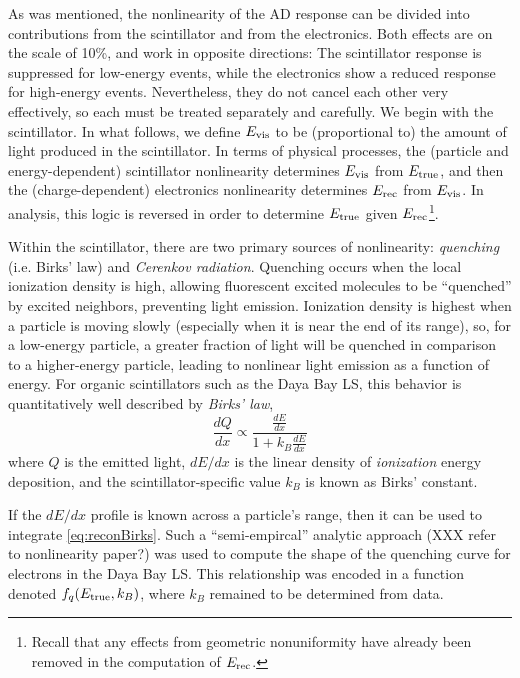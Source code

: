 \documentclass[../thesis.tex]{subfiles}
\begin{document}
As was mentioned, the nonlinearity of the AD response can be divided into contributions from the scintillator and from the electronics. Both effects are on the scale of 10\%, and work in opposite directions: The scintillator response is suppressed for low-energy events, while the electronics show a reduced response for high-energy events. Nevertheless, they do not cancel each other very effectively, so each must be treated separately and carefully. We begin with the scintillator. In what follows, we define $E_\mathrm{vis}$ to be (proportional to) the amount of light produced in the scintillator. In terms of physical processes, the (particle and energy-dependent) scintillator nonlinearity determines $E_\mathrm{vis}$ from $E_\mathrm{true}$, and then the (charge-dependent) electronics nonlinearity determines $E_\mathrm{rec}$ from $E_\mathrm{vis}$. In analysis, this logic is reversed in order to determine $E_\mathrm{true}$ given $E_\mathrm{rec}$\footnote{Recall that any effects from geometric nonuniformity have already been removed in the computation of $E_\mathrm{rec}$.}.

Within the scintillator, there are two primary sources of nonlinearity: \emph{quenching} (i.e. Birks' law) and \emph{Cerenkov radiation}. Quenching occurs when the local ionization density is high, allowing fluorescent excited molecules to be ``quenched'' by excited neighbors, preventing light emission. Ionization density is highest when a particle is moving slowly (especially when it is near the end of its range), so, for a low-energy particle, a greater fraction of light will be quenched in comparison to a higher-energy particle, leading to nonlinear light emission as a function of energy. For organic scintillators such as the Daya Bay LS, this behavior is quantitatively well described by \emph{Birks' law},
\begin{equation}
  \frac{dQ}{dx} \propto \frac{\frac{dE}{dx}}{1 + k_B \frac{dE}{dx}}
  \label{eq:reconBirks}
\end{equation}
where $Q$ is the emitted light, $dE/dx$ is the linear density of \emph{ionization} energy deposition, and the scintillator-specific value $k_B$ is known as Birks' constant.

If the $dE/dx$ profile is known across a particle's range, then it can be used to integrate \eqref{eq:reconBirks}. Such a ``semi-empircal'' analytic approach (XXX refer to nonlinearity paper?) was used to compute the shape of the quenching curve for electrons in the Daya Bay LS. This relationship was encoded in a function denoted $f_q(E_\mathrm{true}, k_B)$, where $k_B$ remained to be determined from data.
\end{document}
